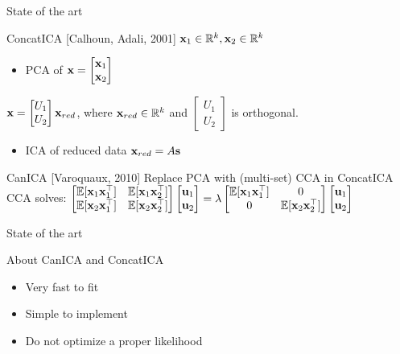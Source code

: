 \documentclass[bigger]{beamer}
\begin{document}
\begin{frame}{State of the art}
\begin{block}{ConcatICA [Calhoun, Adali, 2001]}
  \(\mathbf{x}_1 \in \mathbb{R}^{k}, \mathbf{x}_2 \in \mathbb{R}^{k}\)
  \begin{itemize}
  \item PCA of \(\mathbf{x} = \begin{bmatrix} \mathbf{x}_1 \\ \mathbf{x}_2 \end{bmatrix}\)
  \end{itemize}
  \(\mathbf{x} = \begin{bmatrix} U_1 \\ U_2 \end{bmatrix}  \mathbf{x}_{red} \), 
  where \( \mathbf{x}_{red}  \in \mathbb{R}^{k}\) and 
  \(\begin{bmatrix} U_1 \\ U_2 \end{bmatrix}\)
  is orthogonal.
  \begin{itemize}
  \item ICA of reduced data \( \mathbf{x}_{red}  = A \mathbf{s}\)
  \end{itemize}
\end{block}
\pause
\begin{block}{CanICA [Varoquaux, 2010]}
  Replace PCA with (multi-set) CCA in ConcatICA \\
  CCA solves:
  $\begin{bmatrix} \mathbb{E}[\mathbf{x}_1 \mathbf{x}_1^{\top}] & \mathbb{E}[\mathbf{x}_1 \mathbf{x}_2^{\top}] \\
    \mathbb{E}[\mathbf{x}_2 \mathbf{x}_1^{\top}] & \mathbb{E}[\mathbf{x}_2 \mathbf{x}_2^{\top}]\end{bmatrix} \begin{bmatrix}
    \mathbf{u}_1 \\ \mathbf{u}_2 \end{bmatrix} =
  \lambda \begin{bmatrix} \mathbb{E}[\mathbf{x}_1 \mathbf{x}_1^{\top}] & 0 \\
    0 & \mathbb{E}[\mathbf{x}_2 \mathbf{x}_2^{\top}]\end{bmatrix} \begin{bmatrix}
    \mathbf{u}_1 \\ \mathbf{u}_2 \end{bmatrix}$
\end{block}
\end{frame}

\begin{frame}{State of the art}
  \begin{block}{About CanICA and ConcatICA}
    \begin{itemize}
    \item Very fast to fit
    \item Simple to implement
    \item Do not optimize a proper likelihood
    \end{itemize}
  \end{block}

\end{frame}
\end{document}
